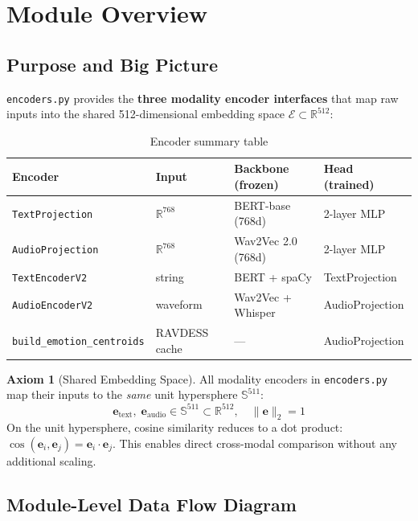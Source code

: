 \documentclass[12pt,a4paper]{article}
\theoremstyle{definition}
\newtheorem{axiom}[theorem]{Axiom}
\theoremstyle{remark}
\begin{document}
\tableofcontents
\newpage

\section{Module Overview}

\subsection{Purpose and Big Picture}

\texttt{encoders.py} provides the \textbf{three modality encoder interfaces}
that map raw inputs into the shared 512-dimensional embedding space
$\mathcal{E} \subset \mathbb{R}^{512}$:

\begin{table}[H]
\centering
\caption{Encoder summary table}
\begin{tabularx}{\textwidth}{lXXX}
\toprule
Encoder & Input & Backbone (frozen) & Head (trained) \\
\midrule
\texttt{TextProjection}         & $\mathbb{R}^{768}$ & BERT-base (768d) & 2-layer MLP \\
\texttt{AudioProjection}        & $\mathbb{R}^{768}$ & Wav2Vec 2.0 (768d) & 2-layer MLP \\
\texttt{TextEncoderV2}          & string & BERT + spaCy & TextProjection \\
\texttt{AudioEncoderV2}         & waveform & Wav2Vec + Whisper & AudioProjection \\
\texttt{build\_emotion\_centroids} & RAVDESS cache & — & AudioProjection \\
\bottomrule
\end{tabularx}
\end{table}

\begin{axiom}[Shared Embedding Space]
All modality encoders in \texttt{encoders.py} map their inputs to the
\emph{same} unit hypersphere $\mathbb{S}^{511}$:
\[
  \mathbf{e}_{\text{text}},\; \mathbf{e}_{\text{audio}} \in \mathbb{S}^{511}
  \subset \mathbb{R}^{512}, \quad \|\mathbf{e}\|_2 = 1
\]
On the unit hypersphere, cosine similarity reduces to a dot product:
$\cos(\mathbf{e}_i, \mathbf{e}_j) = \mathbf{e}_i \cdot \mathbf{e}_j$.
This enables direct cross-modal comparison without any additional scaling.
\end{axiom}

\subsection{Module-Level Data Flow Diagram}
\end{document}
